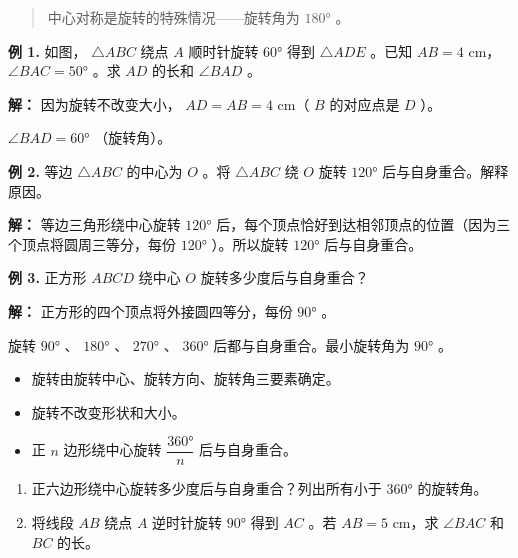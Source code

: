 \begin{quote}
中心对称是旋转的特殊情况——旋转角为 $180°$ 。
\end{quote}


\begin{workedexamples}


\textbf{例 1.} 如图， $\triangle ABC$ 绕点 $A$ 顺时针旋转 $60°$ 得到 $\triangle ADE$ 。已知 $AB = 4$ cm， $\angle BAC = 50°$ 。求 $AD$ 的长和 $\angle BAD$ 。

\textbf{解：}
因为旋转不改变大小， $AD = AB = 4$ cm（ $B$ 的对应点是 $D$ ）。

$\angle BAD = 60°$ （旋转角）。

\textbf{例 2.} 等边 $\triangle ABC$ 的中心为 $O$ 。将 $\triangle ABC$ 绕 $O$ 旋转 $120°$ 后与自身重合。解释原因。

\textbf{解：}
等边三角形绕中心旋转 $120°$ 后，每个顶点恰好到达相邻顶点的位置（因为三个顶点将圆周三等分，每份 $120°$ ）。所以旋转 $120°$ 后与自身重合。

\textbf{例 3.} 正方形 $ABCD$ 绕中心 $O$ 旋转多少度后与自身重合？

\textbf{解：}
正方形的四个顶点将外接圆四等分，每份 $90°$ 。

旋转 $90°$ 、 $180°$ 、 $270°$ 、 $360°$ 后都与自身重合。最小旋转角为 $90°$ 。

\end{workedexamples}

\begin{keytakeaway}


\begin{itemize}
  \item 旋转由旋转中心、旋转方向、旋转角三要素确定。
  \item 旋转不改变形状和大小。
  \item 正 $n$ 边形绕中心旋转 $\dfrac{360°}{n}$ 后与自身重合。
\end{itemize}


\end{keytakeaway}

\begin{practice}


\begin{enumerate}
  \item 正六边形绕中心旋转多少度后与自身重合？列出所有小于 $360°$ 的旋转角。
  \item 将线段 $AB$ 绕点 $A$ 逆时针旋转 $90°$ 得到 $AC$ 。若 $AB = 5$ cm，求 $\angle BAC$ 和 $BC$ 的长。
\end{enumerate}


\end{practice}



